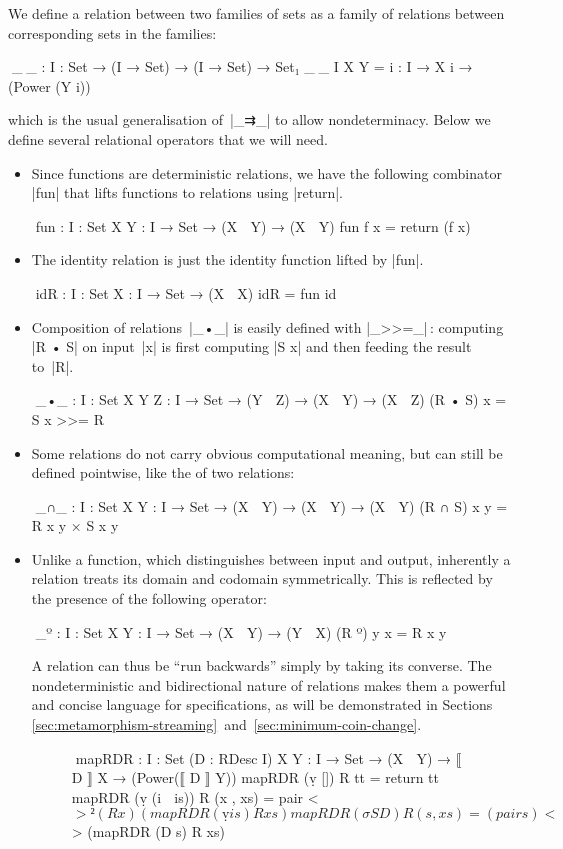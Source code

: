 We define a relation between two families of sets as a family of relations between corresponding sets in the families:
\begin{code}
^^^_↝_ : {I : Set} → (I → Set) → (I → Set) → Set₁
_↝_ {I} X Y = {i : I} → X i → (Power (Y i))
\end{code}
which is the usual generalisation of~|_⇉_| to allow nondeterminacy.
Below we define several relational operators that we will need.
\begin{itemize}
\item Since functions are deterministic relations, we have the following combinator |fun| that lifts functions to relations using |return|.
\begin{code}
^^^fun : {I : Set} {X Y : I → Set} → (X ⇉ Y) → (X ↝ Y)
fun f x = return (f x)
\end{code}
\item The identity relation is just the identity function lifted by |fun|.
\begin{code}
^^^idR : {I : Set} {X : I → Set} → (X ↝ X)
idR = fun id
\end{code}
\item Composition of relations~|_•_| is easily defined with |_>>=_|\,: computing |R • S| on input~|x| is first computing |S x| and then feeding the result to~|R|.
\begin{code}
^^^_•_ : {I : Set} {X Y Z : I → Set} → (Y ↝ Z) → (X ↝ Y) → (X ↝ Z)
(R • S) x = S x >>= R
\end{code}
\item Some relations do not carry obvious computational meaning, but can still be defined pointwise, like the  of two relations:
\begin{code}
^^^_∩_ : {I : Set} {X Y : I → Set} → (X ↝ Y) → (X ↝ Y) → (X ↝ Y)
(R ∩ S) x y = R x y × S x y
\end{code}
\item Unlike a function, which distinguishes between input and output, inherently a relation treats its domain and codomain symmetrically.
This is reflected by the presence of the following  operator:
\begin{code}
^^^_º : {I : Set} {X Y : I → Set} → (X ↝ Y) → (Y ↝ X)
(R º) y x = R x y
\end{code}
A relation can thus be ``run backwards'' simply by taking its converse.
The nondeterministic and bidirectional nature of relations makes them a powerful and concise language for specifications, as will be demonstrated in Sections \ref{sec:metamorphism-streaming}~and~\ref{sec:minimum-coin-change}.
\begin{figure}
\codefigure
\begin{code}
^^^mapRDR :  {I : Set} (D : RDesc I) {X Y : I → Set} →
           (X ↝ Y) → ⟦ D ⟧ X → (Power(⟦ D ⟧ Y))
mapRDR (ṿ [])        R tt        =  return tt
mapRDR (ṿ (i ∷ is))  R (x , xs)  =  pair <$>² (R x) (mapRDR (ṿ is) R xs)
mapRDR (σ S D)       R (s , xs)  =  (pair s) <$> (mapRDR (D s) R xs)


\end{code}
\end{figure}
\end{itemize}
